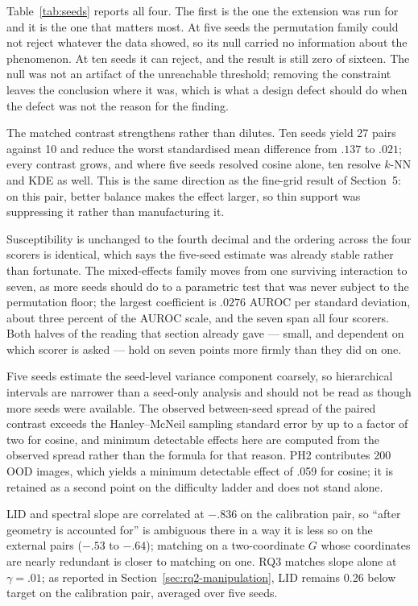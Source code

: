 \documentclass[pdflatex,sn-basic]{sn-jnl}
\theoremstyle{plain}
\theoremstyle{definition}
\theoremstyle{remark}
\begin{document}
Table~\ref{tab:seeds} reports all four. The first is the one the extension was
run for and it is the one that matters most. At five seeds the permutation
family could not reject whatever the data showed, so its null carried no
information about the phenomenon. At ten seeds it can reject, and the result is
still zero of sixteen. The null was not an artifact of the unreachable
threshold; removing the constraint leaves the conclusion where it was, which is
what a design defect should do when the defect was not the reason for the
finding.

The matched contrast strengthens rather than dilutes. Ten seeds yield 27 pairs
against 10 and reduce the worst standardised mean difference from $.137$ to
$.021$; every contrast grows, and where five seeds resolved cosine alone, ten resolve $k$-NN and KDE as well. This
is the same direction as the fine-grid result of Section~5: on this pair, better
balance makes the effect larger, so thin support was suppressing it rather than
manufacturing it.

Susceptibility is unchanged to the fourth decimal and the ordering across the
four scorers is identical, which says the five-seed estimate was already stable
rather than fortunate. The mixed-effects family moves from one surviving
interaction to seven, as more seeds should do to a parametric test that was
never subject to the permutation floor; the largest coefficient is $.0276$
AUROC per standard deviation, about three percent of the AUROC scale, and the
seven span all four scorers. Both halves of the reading that section already
gave --- small, and dependent on which scorer is asked --- hold on seven points
more firmly than they did on one.

Five seeds estimate the seed-level variance component coarsely, so hierarchical intervals are narrower than a seed-only analysis and should not be read as though more seeds were available. The observed between-seed spread of the paired contrast exceeds the Hanley--McNeil sampling standard error by up to a factor of two for cosine, and minimum detectable effects here are computed from the observed spread rather than the formula for that reason. PH2 contributes 200 OOD images, which yields a minimum detectable effect of .059 for cosine; it is retained as a second point on the difficulty ladder and does not stand alone.

LID and spectral slope are correlated at $-.836$ on the calibration pair, so ``after geometry is accounted for'' is ambiguous there in a way it is less so on the external pairs ($-.53$ to $-.64$); matching on a two-coordinate $G$ whose coordinates are nearly redundant is closer to matching on one. RQ3 matches slope alone at $\gamma=.01$; as reported in Section~\ref{sec:rq2-manipulation}, LID remains 0.26 below target on the calibration pair, averaged over five seeds.
\end{document}
